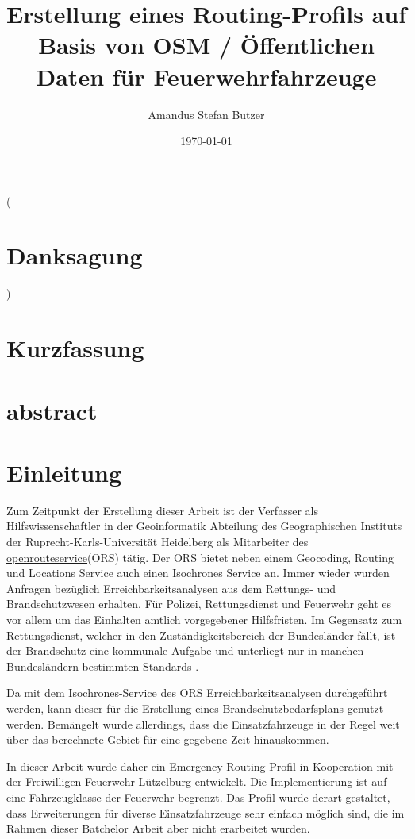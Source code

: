 \documentclass[10pt,a4paper]{article}
\author{Amandus Stefan Butzer}
\title{Erstellung eines Routing-Profils auf Basis von OSM / Öffentlichen Daten für Feuerwehrfahrzeuge}
\date{\today}
\begin{document}
\maketitle

(\section{Danksagung})

\section{Kurzfassung}

\section{abstract}

\section{Einleitung}

Zum Zeitpunkt der Erstellung dieser Arbeit ist der Verfasser als Hilfswissenschaftler in der Geoinformatik Abteilung des Geographischen Instituts der Ruprecht-Karls-Universität Heidelberg als Mitarbeiter des \href{http://www.openrouteservice.org}{openrouteservice}(ORS) tätig. Der ORS bietet neben einem Geocoding, Routing und Locations Service auch einen Isochrones Service an. Immer wieder wurden Anfragen bezüglich Erreichbarkeitsanalysen aus dem Rettungs- und Brandschutzwesen erhalten. Für Polizei, Rettungsdienst und Feuerwehr geht es vor allem um das Einhalten amtlich vorgegebener Hilfsfristen. Im Gegensatz zum Rettungsdienst, welcher in den Zuständigkeitsbereich der Bundesländer fällt, ist der Brandschutz eine kommunale Aufgabe und unterliegt nur in manchen Bundesländern bestimmten Standards \cite{brandschutz bedarfsplan}.

Da mit dem Isochrones-Service des ORS Erreichbarkeitsanalysen durchgeführt werden, kann dieser für die Erstellung eines Brandschutzbedarfsplans genutzt werden. Bemängelt wurde allerdings, dass die Einsatzfahrzeuge in der Regel weit über das berechnete Gebiet für eine gegebene Zeit hinauskommen.

In dieser Arbeit wurde daher ein Emergency-Routing-Profil in Kooperation mit der \href{https://www.feuerwehr-luetzelburg.de}{Freiwilligen Feuerwehr Lützelburg} entwickelt. Die Implementierung ist auf eine Fahrzeugklasse der Feuerwehr begrenzt. Das Profil wurde derart gestaltet, dass Erweiterungen für diverse Einsatzfahrzeuge sehr einfach möglich sind, die im Rahmen dieser Batchelor Arbeit aber nicht erarbeitet wurden. 
\end{document}
